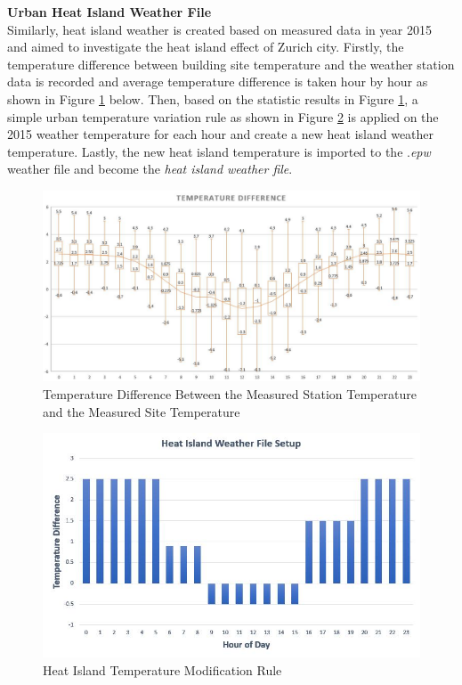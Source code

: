 \documentclass[a4paper, oneside]{discothesis}
\begin{document}
			\textbf{Urban Heat Island Weather File}\\
				Similarly, heat island weather is created based on measured data in year 2015 and aimed to investigate the heat island effect of Zurich city. Firstly, the temperature difference between building site temperature and the weather station data is recorded and average temperature difference is taken hour by hour as shown in Figure \ref{fig:HeatIslandConst} below. Then, based on the statistic results in Figure \ref{fig:HeatIslandConst}, a simple urban temperature variation rule as shown in Figure \ref{fig:HeatIslandRule} is applied on the 2015 weather temperature for each hour and create a new heat island weather temperature. Lastly, the new heat island temperature is imported to the .\textit{epw} weather file and become the \textit{heat island weather file}.


				\begin{figure}[H]
				\centering
				\includegraphics[scale=0.55]{HeatIsland_Construction.jpg}
				\caption{Temperature Difference Between the Measured Station Temperature and the Measured Site Temperature }
				\label{fig:HeatIslandConst}
				\end{figure}
				
				\begin{figure}[H]
				\centering
				\includegraphics[scale=0.75]{HeatIslandConstruction.jpg}
				\caption{Heat Island Temperature Modification Rule}
				\label{fig:HeatIslandRule}
				\end{figure}
				
\end{document}
